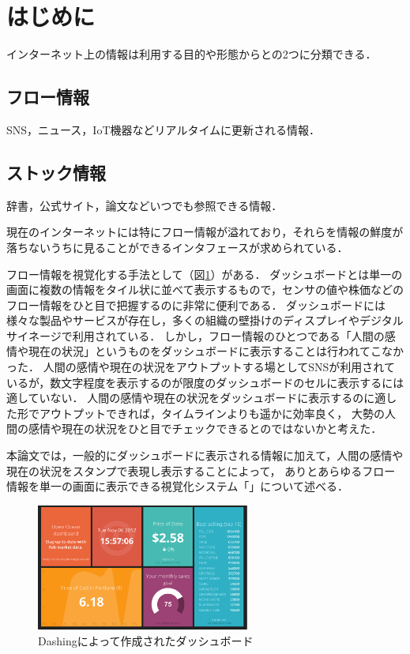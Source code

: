 \section{はじめに}

インターネット上の情報は利用する目的や形態からとの2つに分類できる．

\subsection*{フロー情報}

SNS，ニュース，IoT機器などリアルタイムに更新される情報．

\subsection*{ストック情報}

辞書，公式サイト，論文などいつでも参照できる情報．\vspace{0.2in}

現在のインターネットには特にフロー情報が溢れており，それらを情報の鮮度が落ちないうちに見ることができるインタフェースが求められている．

フロー情報を視覚化する手法として（図\ref{dashing}）がある．
ダッシュボードとは単一の画面に複数の情報をタイル状に並べて表示するもの\cite{few2005}で，センサの値や株価などのフロー情報をひと目で把握するのに非常に便利である．
ダッシュボードには様々な製品やサービスが存在し，多くの組織の壁掛けのディスプレイやデジタルサイネージで利用されている．
しかし，フロー情報のひとつである「人間の感情や現在の状況」というものをダッシュボードに表示することは行われてこなかった．
人間の感情や現在の状況をアウトプットする場としてSNSが利用されているが，数文字程度を表示するのが限度のダッシュボードのセルに表示するには適していない．
人間の感情や現在の状況をダッシュボードに表示するのに適した形でアウトプットできれば，タイムラインよりも遥かに効率良く，
大勢の人間の感情や現在の状況をひと目でチェックできるとのではないかと考えた．

本論文では，一般的にダッシュボードに表示される情報に加えて，人間の感情や現在の状況をスタンプで表現し表示することによって，
ありとあらゆるフロー情報を単一の画面に表示できる視覚化システム「」について述べる．

\begin{figure}[h]
\centering
\includegraphics[width=7cm]{images/dashing.png}
\caption{Dashingによって作成されたダッシュボード}
\label{dashing}
\end{figure}